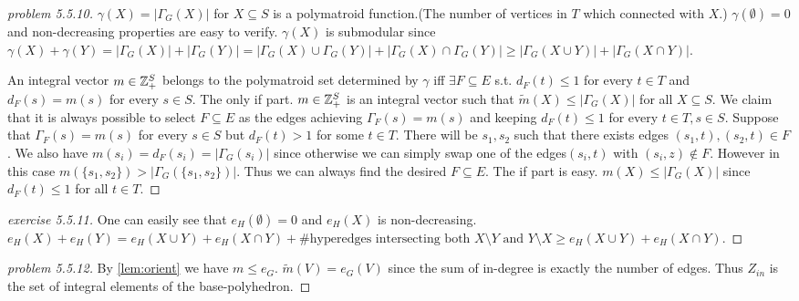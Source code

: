 \begin{proof}[problem 5.5.10]
    $\gamma(X)=|\Gamma_G(X)|$ for $X\subseteq S$ is a polymatroid function.(The number of vertices in $T$ which connected with $X$.) $\gamma(\emptyset)=0$ and non-decreasing properties are easy to verify. $\gamma(X)$ is submodular since $\gamma(X)+\gamma(Y)=|\Gamma_G(X)|+|\Gamma_G(Y)|=|\Gamma_G(X)\cup \Gamma_G(Y)|+|\Gamma_G(X)\cap\Gamma_G(Y)|\geq |\Gamma_G(X\cup Y)|+|\Gamma_G(X\cap Y)|$.

    An integral vector $m\in \Z_+^S$ belongs to the polymatroid set determined by $\gamma$ iff $\exists F\subseteq E$ s.t. $d_F(t)\leq 1$ for every $t\in T$ and $d_F(s)=m(s)$ for every $s\in S$. 
    The only if part. $m\in \Z_+^S$ is an integral vector such that $\widetilde{m}(X)\leq |\Gamma_G(X)|$ for all $X\subseteq S$. We claim that it is always possible to select $F\subseteq E$ as the edges achieving $\Gamma_F(s)=m(s)$ and keeping $d_F(t)\leq 1$ for every $t\in T,s\in S$. Suppose that $\Gamma_F(s)=m(s)$ for every $s\in S$ but $d_F(t)> 1$ for some $t\in T$. There will be $s_1,s_2$ such that there exists edges $(s_1,t),(s_2,t)\in F$. We also have $m(s_i)=d_F(s_i)=|\Gamma_G(s_i)|$ since otherwise we can simply swap one of the edges$(s_i,t)$ with $(s_i,z)\notin F$. However in this case $m(\{s_1,s_2\})>|\Gamma_G(\{s_1,s_2\})|$. Thus we can always find the desired $F\subseteq E$.
    The if part is easy. $m(X)\leq |\Gamma_G(X)|$ since $d_F(t)\leq 1$ for all $t\in T$.
\end{proof}

\begin{proof}[exercise 5.5.11]
    One can easily see that $e_H(\emptyset)=0$ and $e_H(X)$ is non-decreasing.
$e_H(X)+e_H(Y)=e_H(X\cup Y)+e_H(X\cap Y)+\text{\# hyperedges intersecting both $X\setminus Y$ and $Y\setminus X$} \geq e_H(X\cup Y)+e_H(X\cap Y)$.
\end{proof}

\begin{proof}[problem 5.5.12]
    By \autoref{lem:orient} we have $m\leq e_G$. $\widetilde{m}(V)=e_G(V)$ since the sum of in-degree is exactly the number of edges. Thus $Z_{in}$ is the set of integral elements of the base-polyhedron.
\end{proof}

